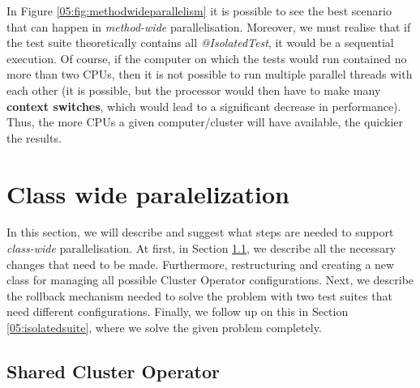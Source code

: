 In Figure \ref {05:fig:methodwideparallelism} it is possible to see the best scenario that can happen in \emph {method-wide} parallelisation.
Moreover, we must realise that if the test suite theoretically contains all \emph{@IsolatedTest}, it would be a sequential execution.
Of course, if the computer on which the tests would run contained no more than two CPUs, then it is not possible to run multiple parallel threads with each other (it is possible, but the processor would then have to make many \textbf{context switches}, which would lead to a significant decrease in performance).
Thus, the more CPUs a given computer/cluster will have available, the quickier the results.

\section{Class wide paralelization}
\label{04:classwideparalelisation}

In this section, we will describe and suggest what steps are needed to support \emph{class-wide} parallelisation.
At first, in Section \ref{05:sharedclusteroperator}, we describe all the necessary changes that need to be made.
Furthermore, restructuring and creating a new class for managing all possible Cluster Operator configurations.
Next, we describe the rollback mechanism needed to solve the problem with two test suites that need different configurations.
Finally, we follow up on this in Section \ref{05:isolatedsuite}, where we solve the given problem completely.

\subsection{Shared Cluster Operator}
\label{05:sharedclusteroperator}

